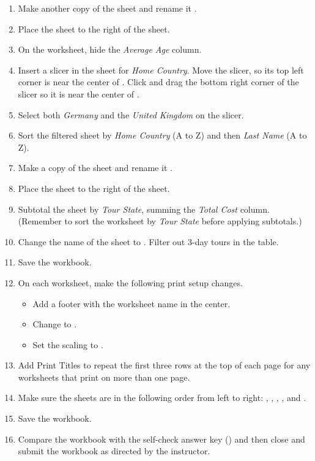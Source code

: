 \begin{enumbox}
\begin{enumerate}
		\item Make another copy of the  sheet and rename it . 
		\item Place the  sheet to the right of the  sheet. 
		\item On the  worksheet, hide the \textit{Average Age} column.
		\item Insert a slicer in the  sheet for \textit{Home Country}. Move the slicer, so its top left corner is near the center of . Click and drag the bottom right corner of the slicer so it is near the center of .
		\item Select both \textit{Germany} and the \textit{United Kingdom} on the slicer.
		\item Sort the filtered sheet by \textit{Home Country} (A to Z) and then \textit{Last Name} (A to Z).
	
		\item Make a copy of the  sheet and rename it .
		\item Place the  sheet to the right of the  sheet. 
		\item Subtotal the sheet by \textit{Tour State}, summing the \textit{Total Cost} column. (Remember to sort the worksheet by \textit{Tour State} before applying subtotals.)
		\item Change the name of the  sheet to . Filter out $ 3 $-day tours in the table.
		\item Save the  workbook.
		\item On each worksheet, make the following print setup changes.
	
		\begin{itemize}
			\item Add a footer with the worksheet name in the center.
			\item Change to .
			\item Set the scaling to .
		\end{itemize}
	
		\item Add Print Titles to repeat the first three rows at the top of each page for any worksheets that print on more than one page.
		\item Make sure the sheets are in the following order from left to right: , , , , and .
		\item Save the  workbook.
		\item Compare the workbook with the self-check answer key () and then close and submit the  workbook as directed by the instructor.
	

\end{enumerate}
\end{enumbox}
